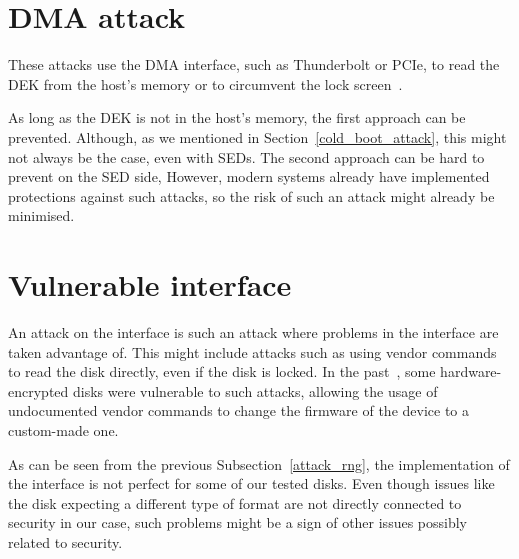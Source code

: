 

\section{DMA attack}

These attacks use the DMA interface, such as Thunderbolt or PCIe, to read the DEK from the host's memory or to circumvent the lock screen~\cite{self_decrypting_risks}. 

\REPLACEME

As long as the DEK is not in the host's memory, the first approach can be prevented. Although, as we mentioned in Section~\ref{cold_boot_attack}, this might not always be the case, even with SEDs.
The second approach can be hard to prevent on the SED side, 
However, modern systems already have implemented protections against such attacks, so the risk of such an attack might already be minimised.


\section{Vulnerable interface}

An attack on the interface is such an attack where problems in the interface are taken advantage of.
This might include attacks such as using vendor commands to read the disk directly, even if the disk is locked. In the past~\cite{self_encrypting_deception}, some hardware-encrypted disks were vulnerable to such attacks, allowing the usage of undocumented vendor commands to change the firmware of the device to a custom-made one. %

\REPLACEME

As can be seen from the previous Subsection~\ref{attack_rng}, the implementation of the interface is not perfect for some of our tested disks. Even though issues like the disk expecting a different type of format are not directly connected to security in our case, such problems might be a sign of other issues possibly related to security.

